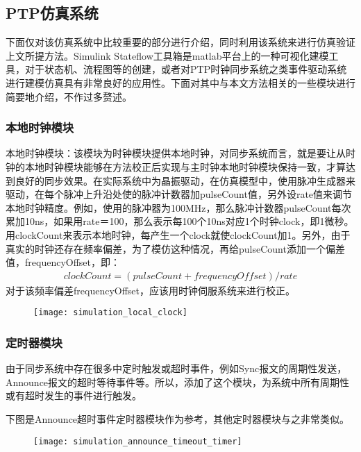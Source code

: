 \subsection{PTP仿真系统}
下面仅对该仿真系统中比较重要的部分进行介绍，同时利用该系统来进行仿真验证上文所提方法。Simulink Stateflow工具箱是matlab平台上的一种可视化建模工具，对于状态机、流程图等的创建，或者对PTP时钟同步系统之类事件驱动系统进行建模仿真具有非常良好的应用性。下面对其中与本文方法相关的一些模块进行简要地介绍，不作过多赘述。

\subsubsection{本地时钟模块}
本地时钟模块：该模块为时钟模块提供本地时钟，对同步系统而言，就是要让从时钟的本地时钟模块能够在方法校正后实现与主时钟本地时钟模块保持一致，才算达到良好的同步效果。在实际系统中为晶振驱动，在仿真模型中，使用脉冲生成器来驱动，在每个脉冲上升沿处使的脉冲计数器加pulseCount值，另外设rate值来调节本地时钟精度。例如，使用的脉冲器为100MHz，那么脉冲计数器pulseCount每次累加10ns，如果用rate＝100，那么表示每100个10ns对应1个时钟clock，即1微秒。用clockCount来表示本地时钟，每产生一个clock就使clockCount加1。另外，由于真实的时钟还存在频率偏差，为了模仿这种情况，再给pulseCount添加一个偏差值，frequencyOffset，即：
\begin{align}
  clockCount = (pulseCount + frequencyOffset) / rate
\end{align}
对于该频率偏差frequencyOffset，应该用时钟伺服系统来进行校正。
\begin{figure}[!hbp]
  \centering
  \begin{minipage}[b]{1\textwidth}
    \captionstyle{\centering}
    \centering
    \texttt{[image: simulation\_local\_clock]}
  \end{minipage}     
\end{figure}

\subsubsection{定时器模块}
由于同步系统中存在很多中定时触发或超时事件，例如Sync报文的周期性发送，Announce报文的超时等待事件等。所以，添加了这个模块，为系统中所有周期性或有超时发生的事件进行触发。

下图是Announce超时事件定时器模块作为参考，其他定时器模块与之非常类似。
\begin{figure}[!hbp]
  \centering
  \begin{minipage}[b]{1\textwidth}
    \captionstyle{\centering}
    \centering
    \texttt{[image: simulation\_announce\_timeout\_timer]}
  \end{minipage}     
\end{figure}

